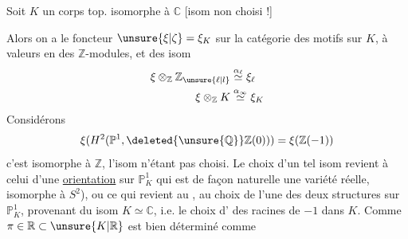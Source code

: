 Soit $K$ un corps top. isomorphe à $\mathbb C$ [isom non choisi !]

Alors on a le foncteur  $\unsure{\xi|\zeta}=\xi_K$ sur la catégorie des motifs sur $K$, à valeurs en des $\mathbb Z$-modules, et des isom
\[
\begin{aligned}
 \xi\otimes_{\mathbb Z}\mathbb Z_{\unsure{\ell|l}} &\overset{\alpha_\ell}{\simeq} \xi_\ell\\
 \xi\otimes_{\mathbb Z}K &\overset{\alpha_\infty}{\simeq} \xi_K
\end{aligned}
\]
Considérons
\[
 \xi(H^2(\mathbb P^1,\deleted{\unsure{\mathbb Q}}\mathbb Z(0)))=\xi(\mathbb Z(-1))
\]
c'est isomorphe à $\mathbb Z$, l'isom n'étant pas choisi. Le choix d'un tel isom  revient à celui d'une \uline{orientation} sur $\mathbb P^1_K$ \unsure{[|(}qui est de façon naturelle une variété  réelle, isomorphe à $S^2$), ou ce qui revient au , au choix de l'une des deux structures  sur $\mathbb P^1_K$, provenant du   isom $K\simeq\mathbb C$, i.e. le choix d'\uline{} des racines de $-1$ dans $K$. Comme $\pi\in\mathbb R\subset\unsure{K|\mathbb R}$ est bien déterminé comme

